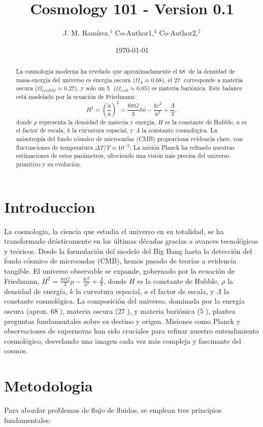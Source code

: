 \documentclass{article}\usepackage{graphicx} \usepackage{amsmath} \usepackage{colortbl}\title{Cosmology 101 - Version 0.1}
\author{J. M. Ram{\'i}rez,$^{1}$ Co-Author1,$^{4}$ Co-Author2,$^{5}$}
\date{\today}
\begin{document}
\maketitle\begin{abstract}
La cosmologia moderna ha revelado que aproximadamente el 68 de la densidad de masa-energía del universo es energía oscura ($\Omega_{\Lambda} \approx 0.68$), el 27 corresponde a materia oscura ($\Omega_{	ext{DM}} \approx 0.27$), y solo un 5 ($\Omega_{	ext{b}} \approx 0.05$) es materia bariónica. Este balance está madelado por la ecuación de Friedmann:
\[
H^2 = \left(
\frac{\dot{a}}{a}
\right)^2 = 
\frac{8\pi G}{3}
ho - 
\frac{kc^2}{a^2} + 
\frac{\Lambda}{3},
\]
donde $\rho$ representa la densidad de materia y energía, $H$ es la constante de Hubble, $a$ es el factor de escala, $k$ la curvatura espacial, y $\Lambda$ la constante cosmológica. La anisotropía del fondo cósmico de microondas (CMB) proporciona evidencia clave, con fluctuaciones de temperatura $\Delta T/T \approx 10^{-5}$. La misión Planck ha refinado nuestras estimaciones de estos parámetros, ofreciendo una visión más precisa del universo primitivo y su evolución.
\end{abstract}\section{Introduccion}
La cosmologia, la ciencia que estudia el universo en su totalidad, se ha transformado drásticamente en las últimas décadas gracias a avances tecnológicos y teóricos. Desde la formulación del modelo del Big Bang hasta la detección del fondo cósmico de microondas (CMB), hemos pasado de teorías a evidencia tangible. El universo observable se expande, gobernado por la ecuación de Friedmann, $H^2 = 
\frac{8\pi G}{3}
\rho - 
\frac{kc^2}{a^2} + 
\frac{\Lambda}{3}$, donde $H$ es la constante de Hubble, $\rho$ la densidad de energía, $k$ la curvatura espacial, $a$ el factor de escala, y $\Lambda$ la constante cosmológica. La composición del universo, dominada por la energía oscura (aprox. 68), materia oscura (27), y materia bariónica (5), plantea preguntas fundamentales sobre su destino y origen. Misiones como Planck y observaciones de supernovas han sido cruciales para refinar nuestro entendimiento cosmológico, desvelando una imagen cada vez más compleja y fascinante del cosmos.\section{Metodologia}
Para abordar problemas de flujo de fluidos, se emplean tres principios fundamentales:
\end{document}
